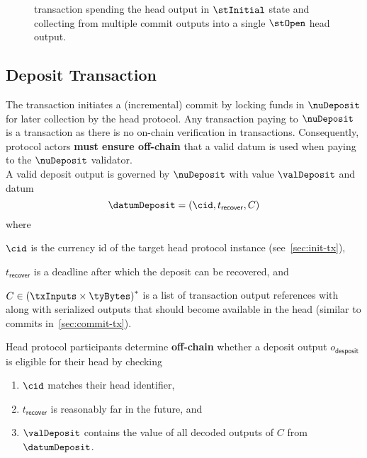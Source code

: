 \begin{figure}
  \centering
  
  \caption{\mtxCCom{} transaction spending the head output in $\stInitial$
	state and collecting from multiple commit outputs into a single
	$\stOpen$ head output.}\label{fig:collectComTx}
\end{figure}


\subsection{Deposit Transaction}\label{sec:deposit-tx}

\noindent The \mtxDeposit{} transaction initiates a (incremental) commit by
locking funds in $\nuDeposit$ for later collection by the head protocol. Any
transaction paying to $\nuDeposit$ is a \mtxDeposit{} transaction as there is no
on-chain verification in \mtxDeposit{} transactions. Consequently, protocol
actors \textbf{must ensure off-chain} that a valid datum is used when paying to
the $\nuDeposit$ validator. \\

\noindent A valid deposit output is governed by $\nuDeposit$ with value $\valDeposit$ and datum
\[
  \datumDeposit = (\cid, t_{\mathsf{recover}}, C)
\]
where
\begin{mitemize}
  \item $\cid$ is the currency id of the target head protocol instance (see~\ref{sec:init-tx}),
  \item $t_{\mathsf{recover}}$ is a deadline after which the deposit can be recovered, and
  \item $C \in {(\txInputs \times \tyBytes)}^{*}$ is a list of transaction output
  references with along with serialized outputs that should become available in
  the head (similar to commits in~\ref{sec:commit-tx}).
\end{mitemize}

\noindent Head protocol participants determine \textbf{off-chain} whether a
deposit output $o_{\mathsf{desposit}}$ is eligible for their head by checking
\begin{enumerate}
  \item $\cid$ matches their head identifier,
  \item $t_{\mathsf{recover}}$ is reasonably far in the future, and
  \item $\valDeposit$ contains the value of all decoded outputs of $C$ from $\datumDeposit$.
\end{enumerate}

